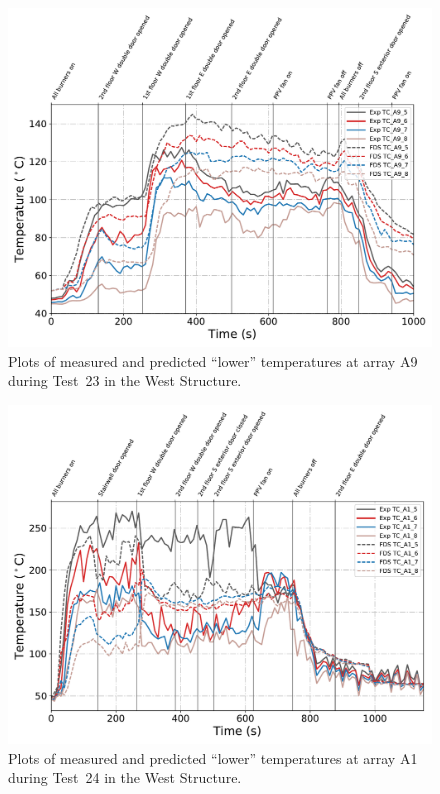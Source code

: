 \begin{figure}[!h]
	\centering
	\includegraphics[width=\columnwidth]{Figures/Plots/Validation/Temperature/Test_23_TC_A9_lower}
	\caption{Plots of measured and predicted ``lower'' temperatures at array A9 during Test~23 in the West Structure.}
	\label{fig:TCA9_lower_data_Test23}
\end{figure}
\begin{figure}[!h]
	\centering
	\includegraphics[width=\columnwidth]{Figures/Plots/Validation/Temperature/Test_24_TC_A1_lower}
	\caption{Plots of measured and predicted ``lower'' temperatures at array A1 during Test~24 in the West Structure.}
	\label{fig:TCA1_lower_data_Test24}
\end{figure}

